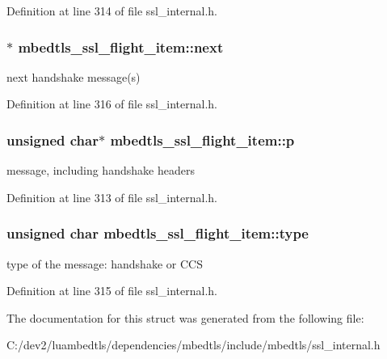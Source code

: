 Definition at line 314 of file ssl\-\_\-internal.\-h.

\hypertarget{structmbedtls__ssl__flight__item_a10b26523d65d985a745e517312ca4ca1}{
\subsubsection[{next}]{$\ast$ mbedtls\-\_\-ssl\-\_\-flight\-\_\-item\-::next}}\label{structmbedtls__ssl__flight__item_a10b26523d65d985a745e517312ca4ca1}
next handshake message(s) 

Definition at line 316 of file ssl\-\_\-internal.\-h.

\hypertarget{structmbedtls__ssl__flight__item_aad7b11522ddc6f7ea383231b9e3cedf1}{
\subsubsection[{p}]{\setlength{\rightskip}{0pt plus 5cm}unsigned char$\ast$ mbedtls\-\_\-ssl\-\_\-flight\-\_\-item\-::p}}\label{structmbedtls__ssl__flight__item_aad7b11522ddc6f7ea383231b9e3cedf1}
message, including handshake headers 

Definition at line 313 of file ssl\-\_\-internal.\-h.

\hypertarget{structmbedtls__ssl__flight__item_acdfcb3e1d7848e7f09d9c00defa90e4b}{
\subsubsection[{type}]{\setlength{\rightskip}{0pt plus 5cm}unsigned char mbedtls\-\_\-ssl\-\_\-flight\-\_\-item\-::type}}\label{structmbedtls__ssl__flight__item_acdfcb3e1d7848e7f09d9c00defa90e4b}
type of the message\-: handshake or C\-C\-S 

Definition at line 315 of file ssl\-\_\-internal.\-h.



The documentation for this struct was generated from the following file\-:\begin{DoxyCompactItemize}
\item 
C\-:/dev2/luambedtls/dependencies/mbedtls/include/mbedtls/ssl\-\_\-internal.\-h\end{DoxyCompactItemize}
